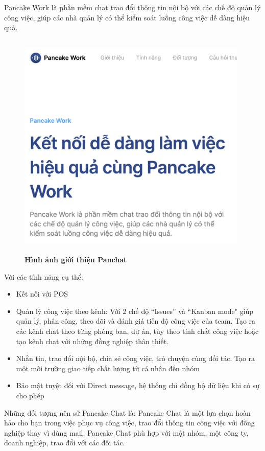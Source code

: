 Pancake Work là phần mềm chat trao đổi thông tin nội bộ với các chế độ quản lý công việc, 
giúp các nhà quản lý có thể kiểm soát luồng công việc dễ dàng hiệu quả.
\begin{figure}[H]
  \centering
  \includegraphics[width=11cm,height=11cm]{Images/pancake/panchat.png}
  \caption[Hình ảnh giới thiệu Panchat]{\bfseries \fontsize{12pt}{0pt}
  \selectfont Hình ảnh giới thiệu Panchat}
  \label{ttlk} %
\end{figure}

Với các tính năng cụ thể: 
\begin{itemize}
  \item Kết nối với POS
  \item Quản lý công việc theo kênh: Với 2 chế độ “Issues” và “Kanban mode" giúp quản lý, phân công, 
  theo dõi và đánh giá tiến độ công việc của team. Tạo ra các kênh chat theo từng phòng ban, dự án, 
  tùy theo tính chất công việc hoặc tạo kênh chat với những đồng nghiệp thân thiết.
  \item Nhắn tin, trao đổi nội bộ, chia sẻ công việc, trò chuyện cùng đối tác. Tạo ra một môi trường giao tiếp chất lượng 
  từ cá nhân đến nhóm
  \item Bảo mật tuyệt đối với Direct message, hệ thống chỉ đồng bộ dữ liệu khi có sự cho phép
\end{itemize}

Những đối tượng nên sử Pancake Chat là: Pancake Chat là một lựa chọn hoàn hảo cho bạn trong việc phục vụ công việc, 
trao đổi thông tin công việc với đồng nghiệp thay vì dùng mail. 
Pancake Chat phù hợp với một nhóm, một công ty, doanh nghiệp, trao đổi với các đối tác.

